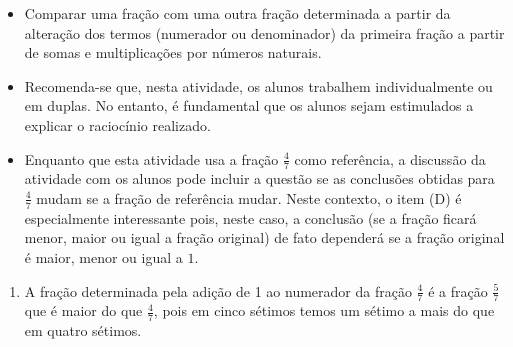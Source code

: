\begin{atividade}\label{chap4-ativ15}
\objetivos
\begin{itemize} %
    \item       Comparar uma fração com uma outra fração determinada a partir da
alteração dos termos (numerador ou denominador) da primeira fração a partir de
somas e multiplicações por números naturais.
\end{itemize} %

\discussoes
\begin{itemize} %
    \item       Recomenda-se que, nesta atividade, os alunos trabalhem
individualmente ou em duplas. No entanto, é fundamental que os alunos sejam
estimulados a explicar o raciocínio realizado.
    \item       Enquanto que esta atividade usa a fração       $\frac{4}{7}$
  como referência, a discussão da atividade com os alunos pode incluir a questão
se as conclusões obtidas para       $\frac{4}{7}$       mudam se a fração de
referência mudar. Neste contexto, o item (D) é especialmente interessante pois,
neste caso, a conclusão (se a fração ficará menor, maior ou igual a fração
original) de fato dependerá se a fração original é maior, menor ou igual a
$1$.
\end{itemize} %

\solucao

\begin{enumerate} %
    \item       A fração determinada pela adição de 1 ao numerador da fração
  $\frac{4}{7}$       é a fração       $\frac{5}{7}$       que é maior do que
   $\frac{4}{7}$, pois em cinco sétimos temos um sétimo a mais do que em quatro
sétimos.


\end{enumerate}
\end{atividade}
